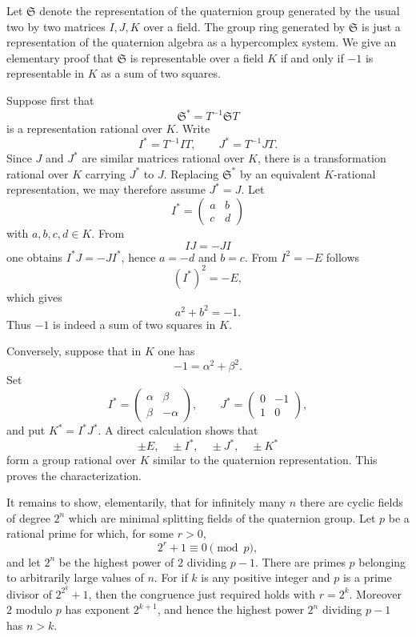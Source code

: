 \documentclass[11pt]{article}
\begin{document}
Let \(\mathfrak S\) denote the representation of the quaternion group
generated by the usual two by two matrices \(I,J,K\) over a field. The
group ring generated by \(\mathfrak S\) is just a representation of the
quaternion algebra as a hypercomplex system. We give an elementary proof
that \(\mathfrak S\) is representable over a field \(K\) if and only if
\(-1\) is representable in \(K\) as a sum of two squares.

Suppose first that \[
  \mathfrak S^*=T^{-1}\mathfrak S T
\] is a representation rational over \(K\). Write \[
  I^*=T^{-1}IT,
  \qquad
  J^*=T^{-1}JT.
\] Since \(J\) and \(J^*\) are similar matrices rational over \(K\),
there is a transformation rational over \(K\) carrying \(J^*\) to \(J\).
Replacing \(\mathfrak S^*\) by an equivalent \(K\)-rational
representation, we may therefore assume \(J^*=J\). Let \[
  I^*=\begin{pmatrix}a&b\\ c&d\end{pmatrix}
\] with \(a,b,c,d\in K\). From \[
  IJ=-JI
\] one obtains \(I^*J=-JI^*\), hence \(a=-d\) and \(b=c\). From
\(I^2=-E\) follows \[
  (I^*)^2=-E,
\] which gives \[
  a^2+b^2=-1.
\] Thus \(-1\) is indeed a sum of two squares in \(K\).

Conversely, suppose that in \(K\) one has \[
  -1=\alpha^2+\beta^2.
\] Set \[
  I^*=\begin{pmatrix}\alpha&\beta\\ \beta&-\alpha\end{pmatrix},
  \qquad
  J^*=\begin{pmatrix}0&-1\\1&0\end{pmatrix},
\] and put \(K^*=I^*J^*\). A direct calculation shows that \[
  \pm E,
  \quad \pm I^*,
  \quad \pm J^*,
  \quad \pm K^*
\] form a group rational over \(K\) similar to the quaternion
representation. This proves the characterization.

It remains to show, elementarily, that for infinitely many \(n\) there
are cyclic fields of degree \(2^n\) which are minimal splitting fields
of the quaternion group. Let \(p\) be a rational prime for which, for
some \(r>0\), \[
  2^r+1\equiv0\pmod p,
\] and let \(2^n\) be the highest power of \(2\) dividing \(p-1\). There
are primes \(p\) belonging to arbitrarily large values of \(n\). For if
\(k\) is any positive integer and \(p\) is a prime divisor of
\(2^{2^k}+1\), then the congruence just required holds with \(r=2^k\).
Moreover \(2\) modulo \(p\) has exponent \(2^{k+1}\), and hence the
highest power \(2^n\) dividing \(p-1\) has \(n>k\).
\end{document}
